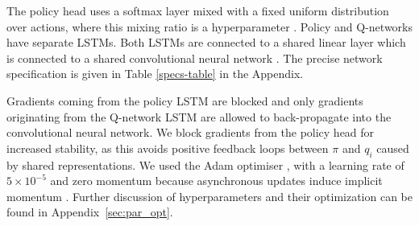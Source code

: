 \documentclass{article}
\begin{document}
The policy head uses a softmax layer mixed with a fixed 
uniform distribution over actions, where this mixing ratio is a 
hyperparameter \citep[Section 5.1.3]{wiering1999explorations}. Policy and 
Q-networks have separate LSTMs. 
Both LSTMs are connected to a shared 
linear layer which is connected to a shared convolutional neural network 
\citep{krizhevsky2012imagenet}. The precise network
specification is given in Table 
\ref{specs-table} in the Appendix.

Gradients coming from the policy LSTM are blocked and only gradients 
originating from the Q-network LSTM are allowed to back-propagate into the convolutional 
neural network. We block gradients 
from the policy head for increased stability, as this avoids positive feedback 
loops between $\pi$ and $q_i$ caused by shared representations. We used the Adam optimiser \citep{kingma2014adam}, with a learning rate of $5 \times 10^{-5}$ 
and zero momentum because asynchronous updates induce 
implicit momentum \citep{mitliagkas2016asynchrony}. 
Further discussion of hyperparameters and their optimization can be found in Appendix~\ref{sec:par_opt}.
\end{document}
